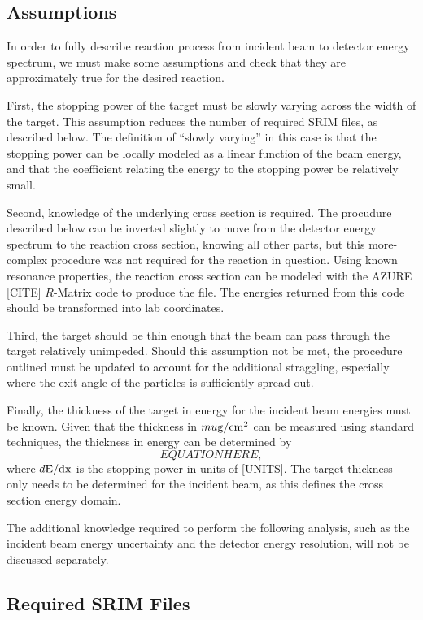 \subsection{Assumptions}\label{assumptions}

In order to fully describe reaction process from incident beam to
detector energy spectrum, we must make some assumptions and check that
they are approximately true for the desired reaction.

First, the stopping power of the target must be slowly varying across
the width of the target. This assumption reduces the number of required
SRIM files, as described below. The definition of ``slowly varying'' in
this case is that the stopping power can be locally modeled as a linear
function of the beam energy, and that the coefficient relating the
energy to the stopping power be relatively small.

Second, knowledge of the underlying cross section is required. The
procudure described below can be inverted slightly to move from the
detector energy spectrum to the reaction cross section, knowing all
other parts, but this more-complex procedure was not required for the
reaction in question. Using known resonance properties, the
 reaction cross section can be
modeled with the AZURE [CITE] $R$-Matrix code to produce the file. The
energies returned from this code should be transformed into lab
coordinates.

Third, the target should be thin enough that the beam can pass through
the target relatively unimpeded. Should this assumption not be met, the
procedure outlined must be updated to account for the additional
straggling, especially where the exit angle of the particles is
sufficiently spread out.

Finally, the thickness of the target in energy for the incident beam
energies must be known. Given that the thickness in $mu\rm{g}/\rm{cm}^2$
can be measured using standard techniques, the thickness in energy can
be determined by
\[
    EQUATION HERE,
\]
where $d\rm{E}/dx$ is the stopping power in units of [UNITS]. The target
thickness only needs to be determined for the incident beam, as this
defines the cross section energy domain.

The additional knowledge required to perform the following analysis,
such as the incident beam energy uncertainty and the detector energy
resolution, will not be discussed separately.


\subsection{Required SRIM Files}\label{required-srim-files}

